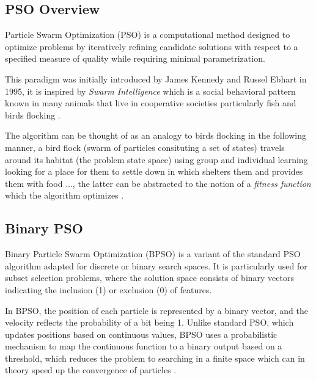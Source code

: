 \documentclass[12pt]{article}
\begin{document}
\subsection{PSO Overview}
Particle Swarm Optimization (PSO) is a computational method designed to optimize problems by iteratively refining candidate solutions with respect to a specified measure of quality while requiring minimal parametrization\cite{pereira2011pso}.

This paradigm was initially introduced by James Kennedy and Russel Ebhart in 1995\cite{pereira2011pso}, it is inspired by \textit{Swarm Intelligence} which is a social behavioral pattern known in many animals that live in cooperative societies particularly fish and birds flocking \cite{ChengS2018swarm}.

The algorithm can be thought of as an analogy to birds flocking in the following manner, a bird flock (swarm of particles consituting a set of states) travels around its habitat (the problem state space) using group and individual learning looking for a place for them to settle down in which shelters them and provides them with food ..., the latter can be abstracted to the notion of a \textit{fitness function} which the algorithm optimizes \cite{sengupta2018}.

\subsection{Binary PSO}

Binary Particle Swarm Optimization (BPSO) is a variant of the standard PSO algorithm adapted for discrete or binary search spaces. It is particularly used for subset selection problems, where the solution space consists of binary vectors indicating the inclusion (1) or exclusion (0) of features.

In BPSO, the position of each particle is represented by a binary vector, and the velocity reflects the probability of a bit being 1. Unlike standard PSO, which updates positions based on continuous values, BPSO uses a probabilistic mechanism to map the continuous function to a binary output based on a threshold, which reduces the problem to searching in a finite space which can in theory speed up the convergence of particles \cite{zain2014bpso}.
\end{document}
